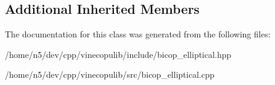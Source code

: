 \subsection*{Additional Inherited Members}


The documentation for this class was generated from the following files\+:\begin{DoxyCompactItemize}
\item 
/home/n5/dev/cpp/vinecopulib/include/bicop\+\_\+elliptical.\+hpp\item 
/home/n5/dev/cpp/vinecopulib/src/bicop\+\_\+elliptical.\+cpp\end{DoxyCompactItemize}
